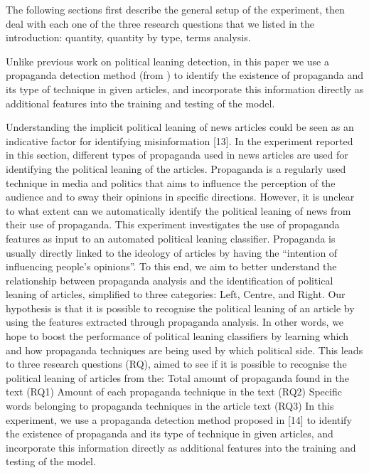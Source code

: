 The following sections first describe the general setup of the experiment, then deal with each one of the three research questions that we listed in the introduction: quantity, quantity by type, terms analysis.%


Unlike previous work on political leaning detection, in this paper we use a propaganda detection method (from \citet{da2019fine}) to identify the existence of propaganda and its type of technique in given articles, and incorporate this information directly as additional features into the training and testing of the model.  


Understanding the implicit political leaning of news articles could be seen as an indicative factor for identifying misinformation [13]. In the experiment reported in this section, different types of propaganda used in news articles are used for identifying the political leaning of the articles. 
Propaganda is a regularly used technique in media and politics that aims to influence the perception of the audience and to sway their opinions in specific directions. However, it is unclear to what extent can we automatically identify the political leaning of news from their use of propaganda. This experiment investigates the use of propaganda features as input to an automated political leaning classifier.
Propaganda is usually directly linked to the ideology of articles by having the “intention of influencing people’s opinions”. To this end, we aim to better understand the relationship between propaganda analysis and the identification of political leaning of articles, simplified to three categories: Left, Centre, and Right.
Our hypothesis is that it is possible to recognise the political leaning of an article by using the features extracted through propaganda analysis. In other words, we hope to boost the performance of political leaning classifiers by learning which and how propaganda techniques are being used by which political side. This leads to three research questions (RQ), aimed to see if it is possible to recognise the political leaning of articles from the:
Total amount of propaganda found in the text (RQ1)
Amount of each propaganda technique in the text (RQ2)
Specific words belonging to propaganda techniques in the article text (RQ3)
In this experiment, we use a propaganda detection method proposed in [14] to identify the existence of propaganda and its type of technique in given articles, and incorporate this information directly as additional features into the training and testing of the model.

